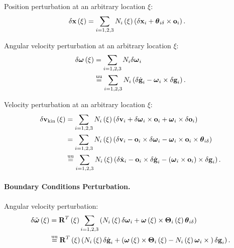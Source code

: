 Position perturbation at an arbitrary location $\xi$:
\begin{align}
	\delta\bm{\mathbf{x}}\left( \xi \right)
	&=
	\sum_{i=1,2,3} N_i\left( \xi \right) \left( 
		\delta\bm{\mathbf{x}}_i + \bm{\mathbf{\theta}}_{i\delta}\times\bm{\mathbf{o}}_i
	 \right)
	.
\end{align}

Angular velocity perturbation at an arbitrary location $\xi$:
\begin{align}
	\delta\bm{\mathbf{\omega}}\left( \xi \right)
	&=
	\sum_{i=1,2,3} N_i \delta\bm{\mathbf{\omega}}_i
	\nonumber \\
	&\overset{\text{uu}}{=}
	\sum_{i=1,2,3} N_i \left( 
		\delta\dot{\bm{\mathbf{g}}}_i
		- \bm{\mathbf{\omega}}_i \times \delta\bm{\mathbf{g}}_i
	 \right)
	.
\end{align}

Velocity perturbation at an arbitrary location $\xi$:
\begin{align}
	\delta\bm{\mathbf{v}}_{\text{kin}}\left( \xi \right)
	&=
	\sum_{i=1,2,3} N_i\left( \xi \right) \left( 
		\delta\bm{\mathbf{v}}_i
		+ \delta\bm{\mathbf{\omega}}_i \times \bm{\mathbf{o}}_i
		+ \bm{\mathbf{\omega}}_i \times \delta\bm{\mathbf{o}}_i
	 \right)
	\nonumber \\
	&= 
	\sum_{i=1,2,3} N_i\left( \xi \right) \left( 
		\delta\bm{\mathbf{v}}_i
		- \bm{\mathbf{o}}_i \times \delta\bm{\mathbf{\omega}}_i
		- \bm{\mathbf{\omega}}_i \times \bm{\mathbf{o}}_i \times \bm{\mathbf{\theta}}_{i\delta}
	 \right)
	\nonumber \\
	&\overset{\text{uu}}{=}
	\sum_{i=1,2,3} N_i\left( \xi \right) \left( 
		\delta\dot{\bm{\mathbf{x}}}_i
		- \bm{\mathbf{o}}_i \times \delta\dot{\bm{\mathbf{g}}}_i
		- \left( \bm{\mathbf{\omega}}_i \times \bm{\mathbf{o}}_i \right) \times \delta\bm{\mathbf{g}}_i
	 \right)
	.
\end{align}


\paragraph{Boundary Conditions Perturbation.}
Angular velocity perturbation:
\begin{align}
	\delta\tilde{\bm{\mathbf{\omega}}}\left( \xi \right)
	&= \bm{\mathbf{R}}^T\left( \xi \right) \sum_{i=1,2,3}\left( 
		N_i\left( \xi \right) \delta\bm{\mathbf{\omega}}_i
		+ \bm{\mathbf{\omega}}\left( \xi \right) \times \bm{\mathbf{\Theta}}_i\left( \xi \right) \bm{\mathbf{\theta}}_{i\delta}
	 \right)
	\nonumber \\
	&\overset{\text{uu}}{=}
	\bm{\mathbf{R}}^T\left( \xi \right) \left( 
		N_i\left( \xi \right) \delta\dot{\bm{\mathbf{g}}}_i
		+ \left( 
			\bm{\mathbf{\omega}}\left( \xi \right) \times \bm{\mathbf{\Theta}}_i\left( \xi \right)
			- N_i\left( \xi \right) \bm{\mathbf{\omega}}_i \times{}
		 \right) \delta\bm{\mathbf{g}}_i
	 \right)
	.
\end{align}

